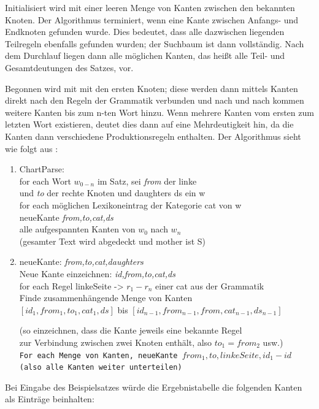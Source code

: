\documentclass[12pt]{report}
\begin{document}
Initialisiert wird mit einer leeren Menge von Kanten zwischen den bekannten Knoten. Der Algorithmus terminiert, wenn eine Kante zwischen Anfangs- und Endknoten gefunden wurde. Dies bedeutet, dass alle dazwischen liegenden Teilregeln ebenfalls gefunden wurden; der Suchbaum ist dann vollständig. Nach dem Durchlauf liegen dann alle möglichen Kanten, das heißt alle Teil- und Gesamtdeutungen des Satzes, vor. 

Begonnen wird mit mit den ersten Knoten; diese werden dann mittels Kanten direkt nach den Regeln der Grammatik verbunden und nach und nach kommen weitere Kanten bis zum n-ten Wort hinzu. Wenn mehrere Kanten vom ersten zum letzten Wort existieren, deutet dies dann auf eine Mehrdeutigkeit hin, da die Kanten dann verschiedene Produktionsregeln enthalten. Der Algorithmus sieht wie folgt aus \cite{cop04}:
\begin{enumerate} \tt
\item 
ChartParse: \\
for each Wort $w_{0-n}$ im Satz, sei \textit{from} der linke \\
und \textit{to} der rechte Knoten und daughters ds ein w \\
\hspace*{.2cm} for each möglichen Lexikoneintrag der Kategorie cat von w \\
\hspace*{.4cm} neueKante \textit{from,to,cat,ds} \\
alle aufgespannten Kanten von $w_{0}$ nach $w_{n}$ \\ \rm(gesamter Text wird abgedeckt und mother ist S)\tt
\item 
neueKante: \textit{from,to,cat,daughters} \\
Neue Kante einzeichnen: \textit{id,from,to,cat,ds} \\
for each Regel linkeSeite -> $r_{1}-r_{n}$ einer cat aus der Grammatik \\
\hspace*{.2cm} Finde zusammenhängende Menge von Kanten \\
\hspace*{.2cm} $[id_{1},from_{1},to_{1},cat_{1},ds]$ bis $[id_{n-1},from_{n-1},from,cat_{n-1},ds_{n-1}]$ 

\rm(so einzeichnen, dass die Kante jeweils  eine bekannte Regel \\
zur Verbindung zwischen zwei Knoten enthält, also $to_{1}=from_{2}$ usw.)\tt \\
\hspace*{.2cm} For each Menge von Kanten, neueKante $from_{1},to,linkeSeite,id_{1}-id$ \rm(also alle Kanten weiter unterteilen)
\end{enumerate}
Bei Eingabe des Beispielsatzes würde die Ergebnistabelle die folgenden Kanten als Einträge beinhalten:
\end{document}
